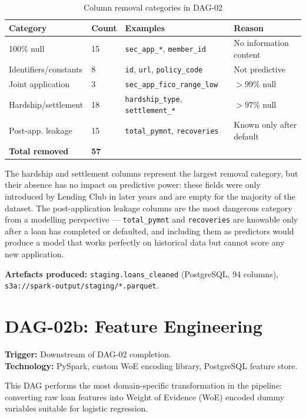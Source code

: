 \documentclass[12pt,a4paper]{report}
\begin{document}
\begin{table}[H]
\centering
\caption{Column removal categories in DAG-02}
\label{tab:colremoval}
\begin{tabular}{llll}
\toprule
\textbf{Category} & \textbf{Count} & \textbf{Examples} & \textbf{Reason} \\
\midrule
100\% null          & 15 & \texttt{sec\_app\_*}, \texttt{member\_id}     & No information content \\
Identifiers/constants& 8  & \texttt{id}, \texttt{url}, \texttt{policy\_code}  & Not predictive \\
Joint application   &  3  & \texttt{sec\_app\_fico\_range\_low}           & $>99\%$ null \\
Hardship/settlement & 18  & \texttt{hardship\_type}, \texttt{settlement\_*} & $>97\%$ null \\
Post-app. leakage   & 15  & \texttt{total\_pymnt}, \texttt{recoveries}   & Known only after default \\
\midrule
\textbf{Total removed} & \textbf{57} & & \\
\bottomrule
\end{tabular}
\end{table}

\medskip
\noindent The hardship and settlement columns represent the largest removal category, but their absence has no impact on predictive power: these fields were only introduced by Lending Club in later years and are empty for the majority of the dataset. The post-application leakage columns are the most dangerous category from a modelling perspective --- \texttt{total\_pymnt} and \texttt{recoveries} are knowable only after a loan has completed or defaulted, and including them as predictors would produce a model that works perfectly on historical data but cannot score any new application.

\textbf{Artefacts produced:} \texttt{staging.loans\_cleaned} (PostgreSQL, 94 columns), \texttt{s3a://spark-output/staging/*.parquet}.

\section{DAG-02b: Feature Engineering}

\textbf{Trigger:} Downstream of DAG-02 completion.\\
\textbf{Technology:} PySpark, custom WoE encoding library, PostgreSQL feature store.

This DAG performs the most domain-specific transformation in the pipeline: converting raw loan features into Weight of Evidence (WoE) encoded dummy variables suitable for logistic regression.
\end{document}
